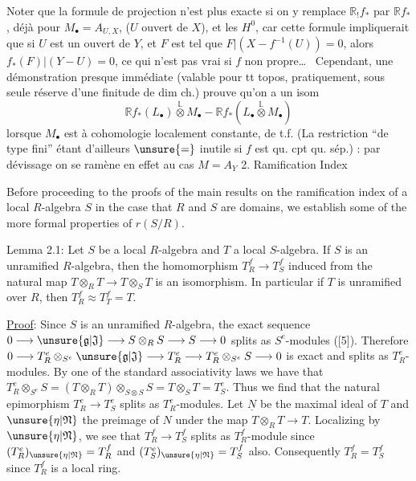 Noter que la formule de projection n'est plus
exacte si on y remplace $\mathbb R_!f_*$ par $\mathbb Rf_*$, déjà pour
$M_\bullet=A_{U,X}$, 
($U$ ouvert de $X$), et les $H^0$, car
cette formule impliquerait que si $U$ est un ouvert
de $Y$, et $F$ est tel que $F\vert(X-f^{-1}(U))=0$, alors
$f_*(F)\vert(Y-U)=0$, ce qui n'est pas vrai si $f$
non propre\ldots\ 
Cependant, une démonstration
presque immédiate (valable pour tt topos, pratiquement,
sous seule réserve d'une finitude de dim ch.)
prouve qu'on a un isom
\[
\mathbb Rf_*(L_\bullet)\overset{\mathbb L}{\otimes}M_\bullet-
\mathbb Rf_*(L_\bullet\overset{\mathbb L}{\otimes}M_\bullet)
\]
lorsque $M_\bullet$ est à cohomologie localement
constante, de t.f. (La restriction ``de type fini''
étant d'ailleurs $\unsure{=}$ inutile si $f$ est
qu. cpt qu. sép.) : par dévissage on se ramène en
effet au cas $M=A_Y$ 
2. Ramification Index

Before proceeding to the proofs of the main results on the ramification
index of a local $R$-algebra $S$ in the case that $R$ and $S$ are  domains,
we establish some of the more formal properties of $r(S/R)$.

Lemma 2.1: Let $S$ be a local $R$-algebra and $T$ a local $S$-algebra.
If $S$ is an unramified $R$-algebra, then the homomorphism $T_R^f\longrightarrow T_S^f$ induced
from the natural map $T\otimes_R T\longrightarrow T\otimes_S T$ is an isomorphism. In particular
if $T$ is unramified over $R$, then $T_R^f\approx T_T^f=T$.

\uline{Proof}: Since $S$ is an unramified $R$-algebra, the exact sequence
$0\longrightarrow\unsure{\mathfrak g|\mathfrak J}\longrightarrow S\otimes_R S\longrightarrow S\longrightarrow0$ splits as $S^e$-modules ([5]). Therefore
$0\longrightarrow T_R^e\otimes_{S^e}\unsure{\mathfrak g|\mathfrak J}\longrightarrow T_R^e\longrightarrow T_R^e\otimes_{S^e}S\longrightarrow0$ is exact and splits as $T_R^e$-
modules. By one of the standard associativity laws we have that $T_R^e\otimes_{S^e}S=
(T\otimes_R T)\otimes_{S\otimes S}S=T\otimes_S T=T_S^e$. Thus we find that the natural epimorphism
$T_R^e\longrightarrow T_S^e$ splits as $T_R^e$-modules. Let $\underline N$ be the maximal ideal of $T$ and $\unsure{\eta|\mathfrak N}$ the
preimage of $N$ under the map $T\otimes_R T\longrightarrow T$. Localizing by $\unsure{\eta|\mathfrak N}$, we see that
$T_R^f\longrightarrow T_S^f$ splits as $T_R^f$-module since $(T_R^e)_{\unsure{\eta|\mathfrak N}}=T_R^f$ and $(T_S^e)_{\unsure{\eta|\mathfrak N}}=T_S^f$ also.
Consequently $T_R^f=T_S^f$ since $T_R^f$ is a local ring.

